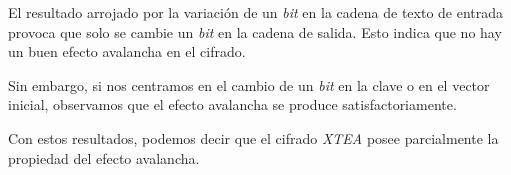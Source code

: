 \documentclass[11pt,a4paper]{article}
\begin{document}
El resultado arrojado por la variación de un \emph{bit} en la cadena
de texto de entrada provoca que solo se cambie un \emph{bit} en la
cadena de salida. Esto indica que no hay un buen efecto avalancha en
el cifrado.

Sin embargo, si nos centramos en el cambio de un \emph{bit} en la
clave o en el vector inicial, observamos que el efecto avalancha se
produce satisfactoriamente.

Con estos resultados, podemos decir que el cifrado \emph{XTEA} posee
parcialmente la propiedad del efecto avalancha.
\end{document}
